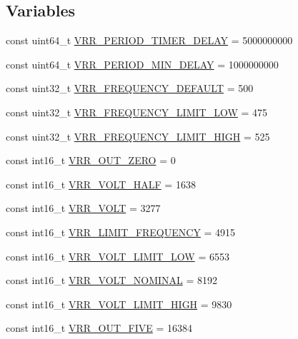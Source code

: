 \subsection*{Variables}
\begin{DoxyCompactItemize}
\item 
const uint64\+\_\+t \hyperlink{group___v_r_r__module_gadc0a5545fe71ae0a54e9790b83f3cc35}{V\+R\+R\+\_\+\+P\+E\+R\+I\+O\+D\+\_\+\+T\+I\+M\+E\+R\+\_\+\+D\+E\+L\+A\+Y} = 5000000000
\item 
const uint64\+\_\+t \hyperlink{group___v_r_r__module_ga6dcb39a1c723e97c190362e56504ce0f}{V\+R\+R\+\_\+\+P\+E\+R\+I\+O\+D\+\_\+\+M\+I\+N\+\_\+\+D\+E\+L\+A\+Y} = 1000000000
\item 
const uint32\+\_\+t \hyperlink{group___v_r_r__module_ga9cff33455fa636577df049d46c6a732c}{V\+R\+R\+\_\+\+F\+R\+E\+Q\+U\+E\+N\+C\+Y\+\_\+\+D\+E\+F\+A\+U\+L\+T} = 500
\item 
const uint32\+\_\+t \hyperlink{group___v_r_r__module_gac34989c91ba32cf4a1203e112a690e99}{V\+R\+R\+\_\+\+F\+R\+E\+Q\+U\+E\+N\+C\+Y\+\_\+\+L\+I\+M\+I\+T\+\_\+\+L\+O\+W} = 475
\item 
const uint32\+\_\+t \hyperlink{group___v_r_r__module_gaa6799d90e01e04a1f23b6a1046b9d2c2}{V\+R\+R\+\_\+\+F\+R\+E\+Q\+U\+E\+N\+C\+Y\+\_\+\+L\+I\+M\+I\+T\+\_\+\+H\+I\+G\+H} = 525
\item 
const int16\+\_\+t \hyperlink{group___v_r_r__module_gad55bb968f6baf24de7bc84da9af56299}{V\+R\+R\+\_\+\+O\+U\+T\+\_\+\+Z\+E\+R\+O} = 0
\item 
const int16\+\_\+t \hyperlink{group___v_r_r__module_gab6986e66860b0f542175fa87d09b9b0c}{V\+R\+R\+\_\+\+V\+O\+L\+T\+\_\+\+H\+A\+L\+F} = 1638
\item 
const int16\+\_\+t \hyperlink{group___v_r_r__module_gad3aaefa339469ae93a965e64c9e19695}{V\+R\+R\+\_\+\+V\+O\+L\+T} = 3277
\item 
const int16\+\_\+t \hyperlink{group___v_r_r__module_ga9475d7ceaf1b4b9d63d458bc8df3c5e0}{V\+R\+R\+\_\+\+L\+I\+M\+I\+T\+\_\+\+F\+R\+E\+Q\+U\+E\+N\+C\+Y} = 4915
\item 
const int16\+\_\+t \hyperlink{group___v_r_r__module_ga7fbce20dbb31f9b5e6891e728242b3b7}{V\+R\+R\+\_\+\+V\+O\+L\+T\+\_\+\+L\+I\+M\+I\+T\+\_\+\+L\+O\+W} = 6553
\item 
const int16\+\_\+t \hyperlink{group___v_r_r__module_ga5d7a8b53b78d87dd46bd3d348a81e9c3}{V\+R\+R\+\_\+\+V\+O\+L\+T\+\_\+\+N\+O\+M\+I\+N\+A\+L} = 8192
\item 
const int16\+\_\+t \hyperlink{group___v_r_r__module_ga0222ba2e8509010d4dcdd18351cf44ba}{V\+R\+R\+\_\+\+V\+O\+L\+T\+\_\+\+L\+I\+M\+I\+T\+\_\+\+H\+I\+G\+H} = 9830
\item 
const int16\+\_\+t \hyperlink{group___v_r_r__module_gadc76104466768c55588f9dfa0d80d851}{V\+R\+R\+\_\+\+O\+U\+T\+\_\+\+F\+I\+V\+E} = 16384
\end{DoxyCompactItemize}


